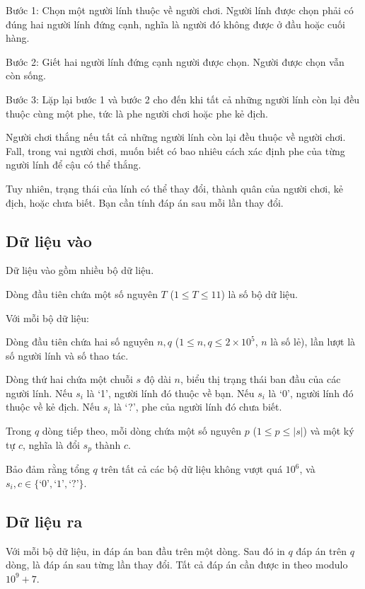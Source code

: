 \documentclass[11pt]{article}
\begin{document}
Bước 1: Chọn một người lính thuộc về người chơi. Người lính được chọn phải có
đúng hai người lính đứng cạnh, nghĩa là người đó không được ở đầu hoặc cuối
hàng.

Bước 2: Giết hai người lính đứng cạnh người được chọn. Người được chọn vẫn còn
sống.

Bước 3: Lặp lại bước 1 và bước 2 cho đến khi tất cả những người lính còn lại
đều thuộc cùng một phe, tức là phe người chơi hoặc phe kẻ địch.

Người chơi thắng nếu tất cả những người lính còn lại đều thuộc về người chơi.
Fall, trong vai người chơi, muốn biết có bao nhiêu cách xác định phe của từng
người lính để cậu có thể thắng.

Tuy nhiên, trạng thái của lính có thể thay đổi, thành quân của người chơi,
kẻ địch, hoặc chưa biết. Bạn cần tính đáp án sau mỗi lần thay đổi.

\subsection*{Dữ liệu vào}

Dữ liệu vào gồm nhiều bộ dữ liệu.

Dòng đầu tiên chứa một số nguyên \(T\) (\(1\le T\le 11\)) là số bộ dữ liệu.

Với mỗi bộ dữ liệu:

Dòng đầu tiên chứa hai số nguyên \(n,q\)
(\(1\le n,q\le 2\times 10^5\), \(n\) là số lẻ), lần lượt là số người lính và
số thao tác.

Dòng thứ hai chứa một chuỗi \(s\) độ dài \(n\), biểu thị trạng thái ban đầu
của các người lính. Nếu \(s_i\) là `1', người lính đó thuộc về bạn. Nếu
\(s_i\) là `0', người lính đó thuộc về kẻ địch. Nếu \(s_i\) là `?', phe của
người lính đó chưa biết.

Trong \(q\) dòng tiếp theo, mỗi dòng chứa một số nguyên \(p\) (\(1\le p\le |s|\))
và một ký tự \(c\), nghĩa là đổi \(s_p\) thành \(c\).

Bảo đảm rằng tổng \(q\) trên tất cả các bộ dữ liệu không vượt quá \(10^6\), và
\(s_i,c\in\{\text{`0'},\text{`1'},\text{`?'}\}\).

\subsection*{Dữ liệu ra}

Với mỗi bộ dữ liệu, in đáp án ban đầu trên một dòng. Sau đó in \(q\) đáp án
trên \(q\) dòng, là đáp án sau từng lần thay đổi. Tất cả đáp án cần được in
theo modulo \(10^9+7\).
\end{document}
